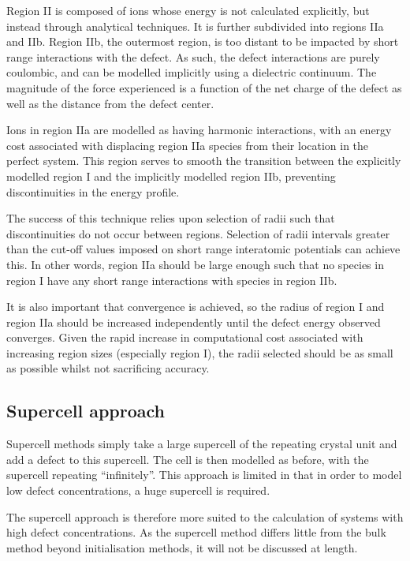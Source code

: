 Region II is composed of ions whose energy is not calculated explicitly, but instead through analytical techniques.
It is further subdivided into regions IIa and IIb.
Region IIb, the outermost region, is too distant to be impacted by short range interactions with the defect.
As such, the defect interactions are purely coulombic, and can be modelled implicitly using a dielectric continuum.
The magnitude of the force experienced is a function of the net charge of the defect as well as the distance from the defect center.


Ions in region IIa are modelled as having harmonic interactions, with an energy cost associated with displacing region IIa species from their location in the perfect system.
This region serves to smooth the transition between the explicitly modelled region I and the implicitly modelled region IIb, preventing discontinuities in the energy profile.

The success of this technique relies upon selection of radii such that discontinuities do not occur between regions.
Selection of radii intervals greater than the cut-off values imposed on short range interatomic potentials can achieve this.
In other words, region IIa should be large enough such that no species in region I have any short range interactions with species in region IIb.

It is also important that convergence is achieved, so the radius of region I and region IIa should be increased independently until the defect energy observed converges.
Given the rapid increase in computational cost associated with increasing region sizes (especially region I), the radii selected should be as small as possible whilst not sacrificing accuracy.

\subsection{Supercell approach}
Supercell methods simply take a large supercell of the repeating crystal unit and add a defect to this supercell.
The cell is then modelled as before, with the supercell repeating ``infinitely''.
This approach is limited in that in order to model low defect concentrations, a huge supercell is required.

The supercell approach is therefore more suited to the calculation of systems with high defect concentrations.
As the supercell method differs little from the bulk method beyond initialisation methods, it will not be discussed at length.

